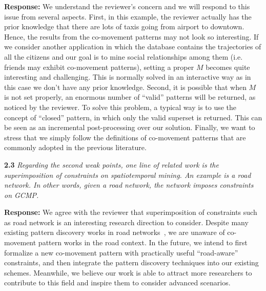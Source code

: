 \documentclass{vldb}
\begin{document}
\textbf{Response:} We understand the reviewer's concern and we will respond to this issue from several aspects. First, in this example, the reviewer actually has the prior knowledge that there are lots of taxis going from airport to downtown. Hence, the results from the co-movement patterns may not look so interesting. If we consider another application in which the database contains the trajectories of all the citizens and our goal is to mine social relationships among them (i.e. friends may exhibit co-movement patterns), setting a proper $M$ becomes quite interesting and challenging. This is normally solved in an interactive way as in this case we don't have any prior knowledge. Second, it is possible that when $M$ is not set properly, an enormous number of ``valid'' patterns will be returned, as noticed by the reviewer. To solve this problem, a typical way is to use the concept of ``closed'' pattern, in which only the valid superset is returned. This can be seen as an incremental post-processing over our solution. Finally, we want to stress that we simply follow the definitions of co-movement patterns that are commonly adopted in the previous literature.



\textbf{2.3} \emph{Regarding the second weak points, one line of related work is the superimposition
of constraints on spatiotemporal mining. An example is a road network. In other words, given a road network, the network imposes constraints on GCMP.}

\textbf{Response:}
We agree with the reviewer that superimposition of constraints such as road network is an interesting research direction to consider. Despite many existing pattern discovery works in road networks~\cite{yu2016spatial,liu2013uncovering,liu2015exploring,xuTaxi2016}, we
are unaware of co-movement pattern works in the road context. 
In the future, we intend
to first formalize a new co-movement pattern with practically useful ``road-aware'' constraints, and then integrate the pattern discovery techniques
into our existing schemes. Meanwhile, we believe our work is able 
to attract more researchers to contribute to this field and inspire them
to consider advanced scenarios.
%
%
%
\end{document}
